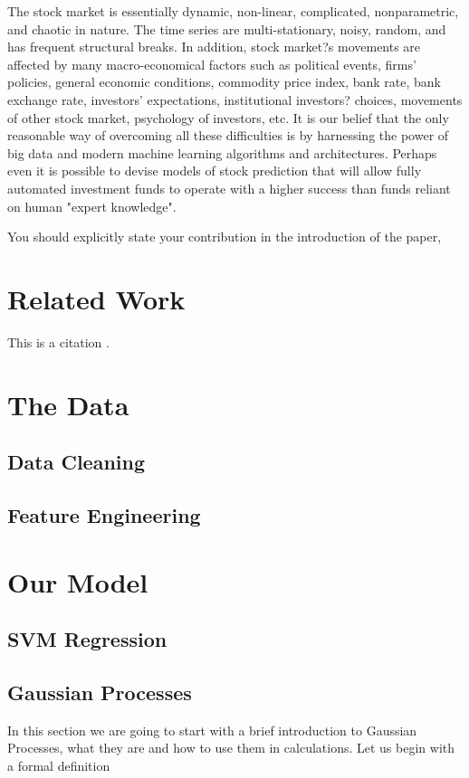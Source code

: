 \documentclass{article}
\def\blu#1{{\color{blu}#1}}
\begin{document}
The stock market is essentially dynamic, non-linear, complicated, nonparametric, and chaotic in nature. The time series are multi-stationary, noisy, random, and has frequent structural breaks. In addition, stock market?s movements are affected by many macro-economical factors such as political events, firms' policies, general economic conditions, commodity price index, bank rate, bank exchange rate, investors' expectations, institutional investors? choices, movements of other stock market, psychology of investors, etc. It is our belief that the only reasonable way of overcoming all these difficulties is by harnessing the power of big data and modern machine learning algorithms and architectures. Perhaps even it is possible to devise models of stock prediction that will allow fully automated investment funds to operate with a higher success than funds reliant on human "expert knowledge".

\blu{You should explicitly state your contribution in the introduction of the paper,}

\section{Related Work}

This is a citation \cite{vapnik1999overview}.

\section{The Data}
\subsection{Data Cleaning}
\subsection{Feature Engineering}

\section{Our Model}
\subsection{SVM Regression}
\subsection{Gaussian Processes}
In this section we are going to start with a brief introduction to Gaussian Processes, what they are
and how to use them in calculations. Let us begin with a formal definition
\end{document}
